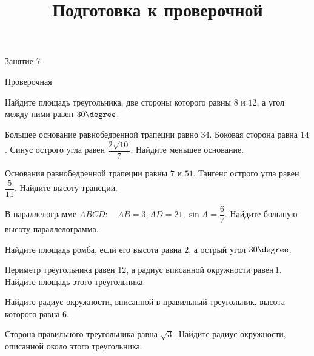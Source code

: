 \begin{class}[number=7]
	\title{Подготовка к проверочной}
	\begin{listofex}
		\item Занятие 7
	\end{listofex}
\end{class}

\begin{exam}
	\begin{listofex}
		\item Проверочная
	\end{listofex}
\end{exam}

\begin{consultation}
	\begin{listofex}
		\item Найдите площадь треугольника, две стороны которого равны \(8\) и \(12\), а угол между ними равен \(30 \degree\).
		\item Большее основание равнобедренной трапеции равно \(34\). Боковая сторона равна \(14\). Синус острого угла равен \( \dfrac{ 2\sqrt{10}}{ 7 } \). Найдите меньшее основание.
		\item Основания равнобедренной трапеции равны \(7\) и \(51\). Тангенс острого угла равен \( \dfrac{ 5 }{ 11 } \).  Найдите высоту трапеции.
		\item В параллелограмме \( ABCD: \quad AB  =  3, AD  =  21, \sin A = \dfrac{ 6 }{ 7 } \). Найдите большую высоту параллелограмма.
		\item Найдите площадь ромба, если его высота равна \(2\), а острый угол \(30\degree \).
		\item Периметр треугольника равен \(12\), а радиус вписанной окружности равен \(1\). Найдите площадь этого треугольника.
		\item Найдите радиус окружности, вписанной в правильный треугольник, высота которого равна \(6\).
		\item Сторона правильного треугольника равна \(\sqrt{3}\). Найдите радиус окружности, описанной около этого треугольника.

\end{listofex}
\end{consultation}
